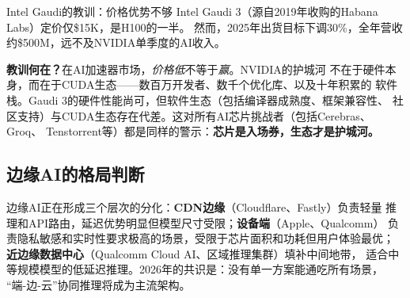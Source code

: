 \begin{warnbox}{Intel Gaudi的教训：价格优势不够}
Intel Gaudi 3（源自2019年收购的Habana Labs）定价仅\$15K，是H100的一半。
然而，2025年出货目标下调30\%，全年营收约\$500M，远不及NVIDIA单季度的AI收入。

\textbf{教训何在？}在AI加速器市场，\emph{价格低}不等于\emph{赢}。NVIDIA的护城河
不在于硬件本身，而在于CUDA生态——数百万开发者、数千个优化库、以及十年积累的
软件栈。Gaudi 3的硬件性能尚可，但软件生态（包括编译器成熟度、框架兼容性、
社区支持）与CUDA生态存在代差。这对所有AI芯片挑战者（包括Cerebras、Groq、
Tenstorrent等）都是同样的警示：\textbf{芯片是入场券，生态才是护城河。}
\end{warnbox}

\subsection{边缘AI的格局判断}

边缘AI正在形成三个层次的分化：\textbf{CDN边缘}（Cloudflare、Fastly）负责轻量
推理和API路由，延迟优势明显但模型尺寸受限；\textbf{设备端}（Apple、Qualcomm）
负责隐私敏感和实时性要求极高的场景，受限于芯片面积和功耗但用户体验最优；
\textbf{近边缘数据中心}（Qualcomm Cloud AI、区域推理集群）填补中间地带，
适合中等规模模型的低延迟推理。2026年的共识是：没有单一方案能通吃所有场景，
``端-边-云''协同推理将成为主流架构。
